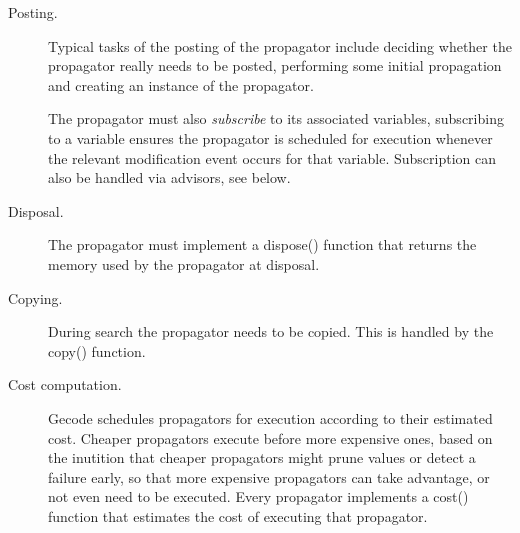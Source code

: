 \documentclass[a4paper,11pt]{article}
\numberwithin{equation}{section}
\begin{document}
\begin{description}
  \item[Posting.] 
    Typical tasks of the posting of the propagator include
    deciding whether the propagator really needs to be posted,
    performing some initial propagation and creating an
    instance of the propagator.
    
    The propagator must also \emph{subscribe} to its associated variables,
    subscribing to a variable ensures the propagator is scheduled
    for execution whenever the relevant modification event occurs
    for that variable. Subscription can also be handled via
    advisors, see below.

  \item[Disposal.] The propagator must implement a dispose() function that
    returns the memory used by the propagator at disposal.

  \item[Copying.] During search the propagator needs to be copied. This is
    handled by the copy() function.

  \item[Cost computation.] Gecode schedules propagators for execution according
    to their estimated cost. Cheaper propagators execute before more expensive
    ones, based on the inutition that cheaper propagators might prune values
    or detect a failure early, so that more expensive propagators can take
    advantage, or not even need to be executed. Every propagator implements
    a cost() function that estimates the cost of executing that propagator.


\end{description}
\end{document}
